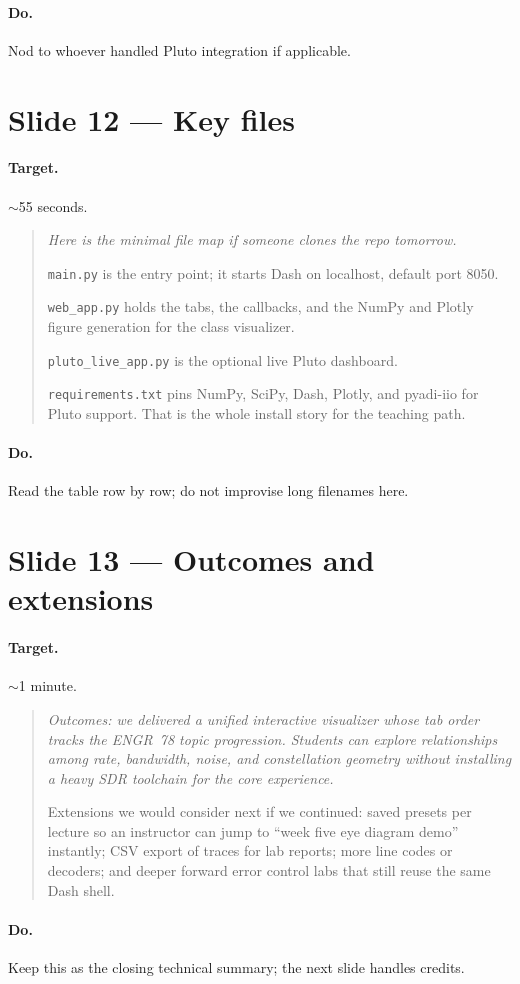 \documentclass[11pt,a4paper]{article}
\newcommand{\speak}[1]{%
  \begin{quote}\itshape #1\end{quote}%
}
\newcommand{\doitem}[1]{\paragraph{Do.} #1\par\vspace{0.6em}}
\begin{document}
\doitem{Nod to whoever handled Pluto integration if applicable.}

\section{Slide 12 --- Key files}

\paragraph{Target.} $\sim$55 seconds.

\speak{%
Here is the minimal file map if someone clones the repo tomorrow.

\texttt{main.py} is the entry point; it starts Dash on localhost, default port 8050.

\texttt{web\_app.py} holds the tabs, the callbacks, and the NumPy and Plotly figure generation for the class visualizer.

\texttt{pluto\_live\_app.py} is the optional live Pluto dashboard.

\texttt{requirements.txt} pins NumPy, SciPy, Dash, Plotly, and pyadi-iio for Pluto support. That is the whole install story for the teaching path.%
}

\doitem{Read the table row by row; do not improvise long filenames here.}

\section{Slide 13 --- Outcomes and extensions}

\paragraph{Target.} $\sim$1 minute.

\speak{%
Outcomes: we delivered a unified interactive visualizer whose tab order tracks the ENGR~78 topic progression. Students can explore relationships among rate, bandwidth, noise, and constellation geometry without installing a heavy SDR toolchain for the core experience.

Extensions we would consider next if we continued: saved presets per lecture so an instructor can jump to ``week five eye diagram demo'' instantly; CSV export of traces for lab reports; more line codes or decoders; and deeper forward error control labs that still reuse the same Dash shell.%
}

\doitem{Keep this as the closing technical summary; the next slide handles credits.}
\end{document}
